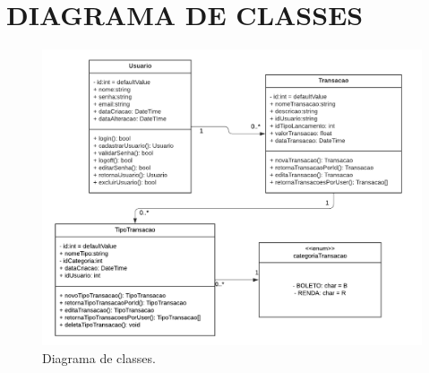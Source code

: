 \chapter{DIAGRAMA DE CLASSES}

\begin{figure}[htb]
	\caption{\label{fig:classDiagram}Diagrama de classes.}
	\begin{center}
		\includegraphics[scale=0.9]{images/classDiagram.png}
	\end{center}
\end{figure}